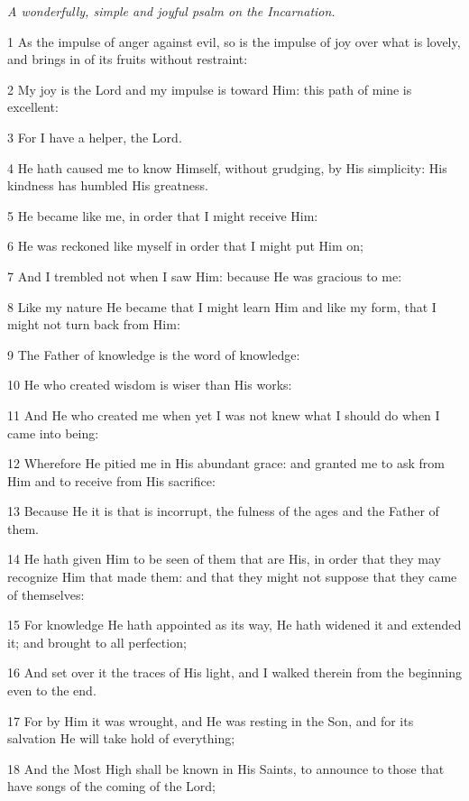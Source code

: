\par \textit{A wonderfully, simple and joyful psalm on the Incarnation.}

\par 1 As the impulse of anger against evil, so is the impulse of joy over what is lovely, and brings in of its fruits without restraint:
\par 2 My joy is the Lord and my impulse is toward Him: this path of mine is excellent:
\par 3 For I have a helper, the Lord.
\par 4 He hath caused me to know Himself, without grudging, by His simplicity: His kindness has humbled His greatness.
\par 5 He became like me, in order that I might receive Him:
\par 6 He was reckoned like myself in order that I might put Him on;
\par 7 And I trembled not when I saw Him: because He was gracious to me:
\par 8 Like my nature He became that I might learn Him and like my form, that I might not turn back from Him:
\par 9 The Father of knowledge is the word of knowledge:
\par 10 He who created wisdom is wiser than His works:
\par 11 And He who created me when yet I was not knew what I should do when I came into being:
\par 12 Wherefore He pitied me in His abundant grace: and granted me to ask from Him and to receive from His sacrifice:
\par 13 Because He it is that is incorrupt, the fulness of the ages and the Father of them.
\par 14 He hath given Him to be seen of them that are His, in order that they may recognize Him that made them: and that they might not suppose that they came of themselves:
\par 15 For knowledge He hath appointed as its way, He hath widened it and extended it; and brought to all perfection;
\par 16 And set over it the traces of His light, and I walked therein from the beginning even to the end.
\par 17 For by Him it was wrought, and He was resting in the Son, and for its salvation He will take hold of everything;
\par 18 And the Most High shall be known in His Saints, to announce to those that have songs of the coming of the Lord;
